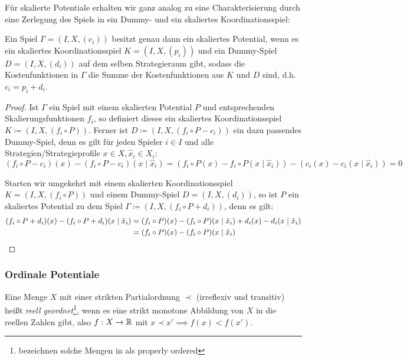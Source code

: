 Für skalierte Potentiale erhalten wir ganz analog zu  eine Charakterisierung durch eine Zerlegung des Spiels in ein Dummy- und ein skaliertes Koordinationsspiel:

\begin{satz}\label{satz:CharSkalPot}
	Ein Spiel $\Gamma = (I, X, (c_i))$ besitzt genau dann ein skaliertes Potential, wenn es ein skaliertes Koordinationsspiel $K = (I, X, (p_i))$ und ein Dummy-Spiel $D = (I, X, (d_i))$ auf dem selben Strategieraum gibt, sodass die Kostenfunktionen in $\Gamma$ die Summe der Kostenfunktionen aus $K$ und $D$ sind, d.h. $c_i = p_i + d_i$.
\end{satz}

\begin{proof}
	Ist $\Gamma$ ein Spiel mit einem skalierten Potential $P$ und entsprechenden Skalierungsfunktionen $f_i$, so definiert dieses ein skaliertes Koordinationsspiel $K \coloneqq (I, X, (f_i \circ P))$. Ferner ist $D \coloneqq (I, X, (f_i\circ P-c_i))$ ein dazu passendes Dummy-Spiel, denn es gilt für jeden Spieler $i \in I$ und alle Strategien/Strategieprofile $x \in X, \hat{x}_i \in X_i$:
	\[(f_i\circ P-c_i)(x) - (f_i\circ P-c_i)(x \mid \hat{x}_i) = \left(f_i\circ P(x) - f_i\circ P(x \mid \hat{x}_i)\right) - \left(c_i(x) - c_i(x \mid \hat{x}_i)\right) = 0 \]
	
	Starten wir umgekehrt mit einem skalierten Koordinationsspiel $K = (I, X, (f_i \circ P))$ und einem Dummy-Spiel $D = (I, X, (d_i))$, so ist $P$ ein skaliertes Potential zu dem Spiel $\Gamma \coloneqq (I, X, (f_i\circ P + d_i))$, denn es gilt:
		\begin{align*}
			(f_i\circ P + d_i)(x) - (f_i\circ P + d_i)(x \mid \hat{x}_i) &= (f_i\circ P)(x) - (f_i\circ P)(x \mid \hat{x}_i) + d_i(x) - d_i(x \mid \hat{x}_i) \\
				&= (f_i\circ P)(x) - (f_i\circ P)(x \mid \hat{x}_i) \qedhere
		\end{align*}
\end{proof}


\subsubsection{Ordinale Potentiale}

\begin{defn}
	Eine Menge $X$ mit einer strikten Partialordnung $\prec$ (irreflexiv und transitiv) heißt \emph{reell geordnet}\footnote{\citeauthor{CharExOrdPot} bezeichnen solche Mengen in \cite{CharExOrdPot} als \glqq properly ordered\grqq}, wenn es eine strikt monotone Abbildung von $X$ in die reellen Zahlen gibt, also $f: X \to \mathbb{R}$ mit $x \prec x' \implies f(x) < f(x')$.
\end{defn}

